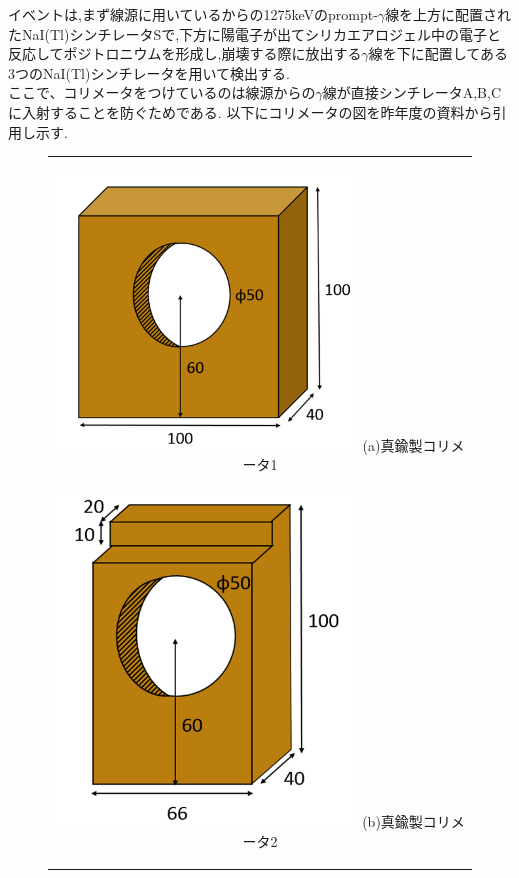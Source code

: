 イベントは,まず線源に用いているからの1275keVのprompt-$\gamma$線を上方に配置されたNaI(Tl)シンチレータSで,下方に陽電子が出てシリカエアロジェル中の電子と反応してポジトロニウムを形成し,崩壊する際に放出する$\gamma$線を下に配置してある3つのNaI(Tl)シンチレータを用いて検出する.\\
ここで、コリメータをつけているのは線源からの$\gamma$線が直接シンチレータA,B,Cに入射することを防ぐためである.
以下にコリメータの図を昨年度の資料から引用し示す.
\begin{figure}[H]
	\begin{center}
		\begin{tabular}{c}
			\begin{minipage}{0.5\hsize}
				\begin{center}
					\includegraphics[width=80mm]{fig/isb/collimator1.png}
					\hspace{1.6cm} (a)真鍮製コリメータ1
				\end{center}
			\end{minipage}
			\begin{minipage}{0.5\hsize}
				\begin{center}
					\includegraphics[width=80mm]{fig/isb/collimator2.png}
					\hspace{1.6cm} (b)真鍮製コリメータ2
				\end{center}
			\end{minipage}
		\end{tabular}
	\end{center}
\end{figure}

